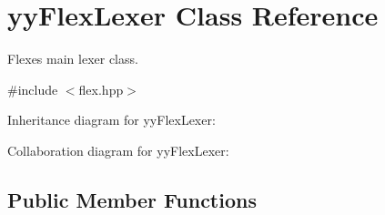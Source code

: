 \hypertarget{classyyFlexLexer}{}\section{yy\+Flex\+Lexer Class Reference}
\label{classyyFlexLexer}


Flex\textquotesingle{}es main lexer class.  




{\ttfamily \#include $<$flex.\+hpp$>$}



Inheritance diagram for yy\+Flex\+Lexer\+:


Collaboration diagram for yy\+Flex\+Lexer\+:
\subsection*{Public Member Functions}
